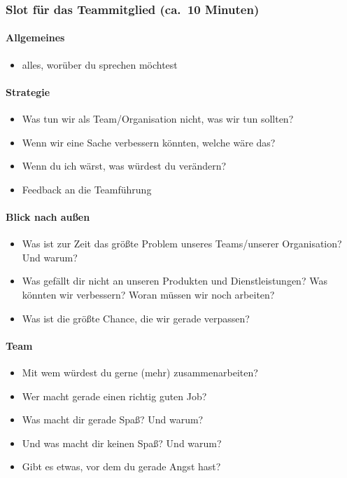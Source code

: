 \subsubsection{Slot für das Teammitglied (ca.~10 Minuten)}

\paragraph{Allgemeines}
\begin{itemize}
 \item alles, worüber du sprechen möchtest
\end{itemize}

\paragraph{Strategie}
\begin{itemize}
 \item Was tun wir als Team/Organisation nicht, was wir tun sollten?
 \item Wenn wir eine Sache verbessern könnten, welche wäre das?
 \item Wenn du ich wärst, was würdest du verändern?
 \item Feedback an die Teamführung
\end{itemize}

\paragraph{Blick nach außen}
\begin{itemize}
 \item Was ist zur Zeit das größte Problem unseres Teams/unserer Organisation? Und warum?
 \item Was gefällt dir nicht an unseren Produkten und Dienstleistungen? Was könnten wir verbessern? Woran müssen wir noch arbeiten?
 \item Was ist die größte Chance, die wir gerade verpassen?
\end{itemize}

\paragraph{Team}
\begin{itemize}
 \item Mit wem würdest du gerne (mehr) zusammenarbeiten?
 \item Wer macht gerade einen richtig guten Job?
 \item Was macht dir gerade Spaß? Und warum?
 \item Und was macht dir keinen Spaß? Und warum?
 \item Gibt es etwas, vor dem du gerade Angst hast?
\end{itemize}


